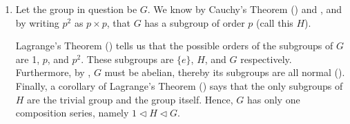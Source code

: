\begin{enumerate}
    \item Let the group in question be $G$. We know by Cauchy's Theorem () and , and by writing $p^2$ as $p \times p$, that $G$ has a subgroup of order $p$ (call this $H$).
    
    Lagrange's Theorem () tells us that the possible orders of the subgroups of $G$ are 1, $p$, and $p^2$. These subgroups are $\{e\}$, $H$, and $G$ respectively. Furthermore, by , $G$ must be abelian, thereby its subgroups are all normal (). Finally, a corollary of Lagrange's Theorem () says that the only subgroups of $H$ are the trivial group and the group itself. Hence, $G$ has only one composition series, namely $1 \lhd H \lhd G$.
\end{enumerate}

